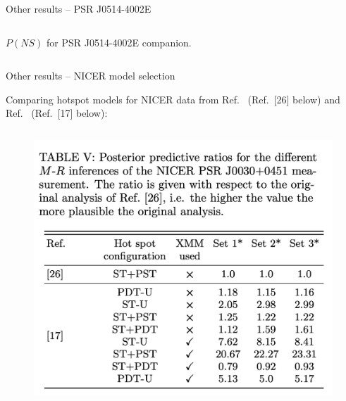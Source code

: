 \documentclass[usenames,dvipsnames,t]{beamer}
\begin{document}
\begin{frame}{Other results -- PSR J0514-4002E}
\begin{columns}
  \footnotesize
  \begin{center}
    $P(NS)$ for PSR J0514-4002E companion.
  \end{center}
  \normalsize

  \end{columns}

\end{frame}

\begin{frame}{Other results -- NICER model selection}
  
    \def\x{3mm}

    Comparing hotspot models for NICER data from Ref.~\cite{Riley:2019yda} (Ref.~[26] below) and Ref.~\cite{Vinciguerra:2023qxq} (Ref.~[17] below):
  
    \begin{columns}

      \begin{figure}
        \centering
        \includegraphics[width=0.95\linewidth]{Figures/table_NICER.jpg}
      \end{figure}



\end{columns}
\end{frame}
\end{document}
